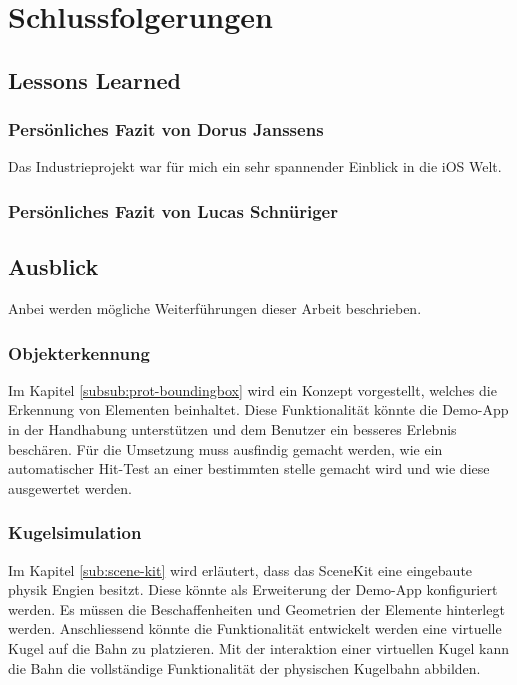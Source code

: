 \section{Schlussfolgerungen}

\subsection{Lessons Learned}

\subsubsection{Persönliches Fazit von Dorus Janssens}
Das Industrieprojekt war für mich ein sehr spannender Einblick in die iOS Welt.

\subsubsection{Persönliches Fazit von Lucas Schnüriger}


\subsection{Ausblick}

Anbei werden mögliche Weiterführungen dieser Arbeit beschrieben.

\subsubsection{Objekterkennung}
Im Kapitel \ref{subsub:prot-boundingbox} wird ein Konzept vorgestellt, welches die Erkennung von Elementen beinhaltet. Diese Funktionalität könnte die Demo-App in der Handhabung unterstützen und dem Benutzer ein besseres Erlebnis beschären. Für die Umsetzung muss ausfindig gemacht werden, wie ein automatischer Hit-Test an einer bestimmten stelle gemacht wird und wie diese ausgewertet werden.

\subsubsection{Kugelsimulation}
Im Kapitel \ref{sub:scene-kit} wird erläutert, dass das SceneKit eine eingebaute physik Engien besitzt. Diese könnte als Erweiterung der Demo-App konfiguriert werden. Es müssen die Beschaffenheiten und Geometrien der Elemente hinterlegt werden. Anschliessend könnte die Funktionalität entwickelt werden eine virtuelle Kugel auf die Bahn zu platzieren. Mit der interaktion einer virtuellen Kugel kann die Bahn die vollständige Funktionalität der physischen Kugelbahn abbilden.

